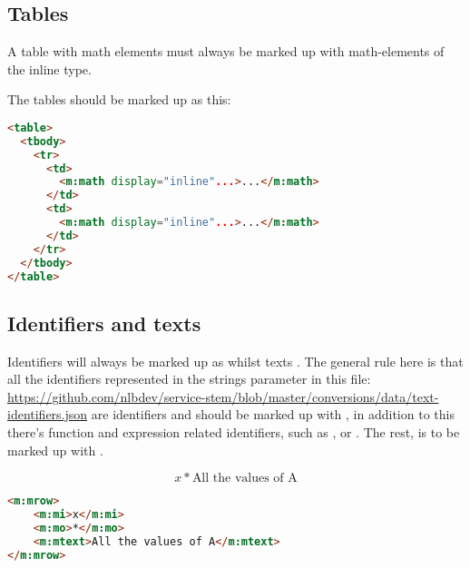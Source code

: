 \documentclass[english,a4paper,11pt]{article}
\begin{document}
\subsection{Tables}

A table with math elements must always be marked up with math-elements of the inline type.

\begin{eksempler}
The tables should be marked up as this:
\begin{lstlisting}[language=HTML]
<table>
  <tbody>
    <tr>
      <td>
        <m:math display="inline"...>...</m:math>
      </td>
      <td>
        <m:math display="inline"...>...</m:math>
      </td>
    </tr>
  </tbody>
</table>
\end{lstlisting}
\end{eksempler}

\subsection{Identifiers and texts}

Identifiers will always be marked up as  whilst texts . The general rule here is that all the identifiers represented in the strings parameter in this file: \url{https://github.com/nlbdev/service-stem/blob/master/conversions/data/text-identifiers.json} are identifiers and should be marked up with , in addition to this there's function and expression related identifiers, such as ,  or . The rest, is to be marked up with .

\begin{eksempler}
\begin{equation}
	x * \text{All the values of A}
\end{equation}
\begin{lstlisting}[language=HTML]
<m:mrow>
	<m:mi>x</m:mi>
	<m:mo>*</m:mo>
	<m:mtext>All the values of A</m:mtext>
</m:mrow>
\end{lstlisting}
\end{eksempler}
\end{document}
